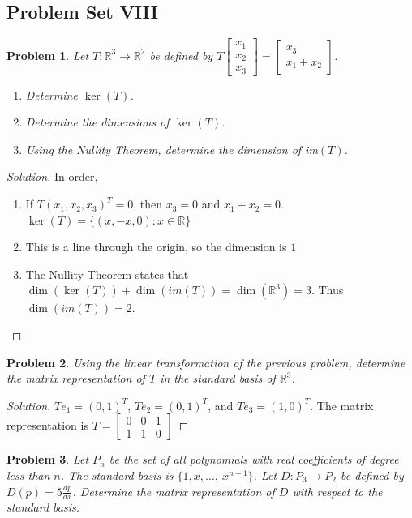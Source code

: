 \documentclass[oneside]{book}
\theoremstyle{mystyle}
\newtheorem{problem}{Problem}[section]
\begin{document}
\subsection{Problem Set VIII}
\begin{problem}
Let $T:\mathbb{R}^3\rightarrow \mathbb{R}^2$ be defined by $T\begin{bmatrix} x_1 \\ x_2 \\ x_3 \end{bmatrix} = \begin{bmatrix} x_3 \\ x_1+x_2 \end{bmatrix}$.
\begin{enumerate}[itemsep=0pt]
    \item Determine $\ker(T)$.
    \item Determine the dimensions of $\ker(T)$.
    \item Using the Nullity Theorem, determine the dimension of im$(T)$.
\end{enumerate}
\end{problem}
\begin{proof}[Solution]
In order,
\begin{enumerate}[itemsep=0pt]
    \item If $T(x_{1},x_{2},x_{3})^{T} = 0$, then $x_3=0$ and $x_{1}+x_{2}=0$. $\ker(T)=\{(x,-x,0):x\in \mathbb{R}\}$
    \item This is a line through the origin, so the dimension is $1$ 
    \item The Nullity Theorem states that $\dim(\ker(T))+\dim(im(T)) = \dim(\mathbb{R}^3) = 3$. Thus $\dim(im(T)) = 2$.
\end{enumerate}
\end{proof}
\begin{problem}
Using the linear transformation of the previous problem, determine the matrix representation of $T$ in the standard basis of $\mathbb{R}^3$.
\end{problem}
\begin{proof}[Solution]
$Te_1 = (0,1)^T$, $T e_2 = (0,1)^T$, and $Te_3 = (1,0)^T$. The matrix representation is $T=\begin{bmatrix} 0 & 0 & 1 \\ 1 & 1 & 0 \end{bmatrix}$
\end{proof}
\begin{problem}
Let $P_n$ be the set of all polynomials with real coefficients of degree less than $n$. The standard basis is $\{1,x,\hdots, \ x^{n-1}\}$. Let $D:P_3 \rightarrow P_2$ be defined by $D(p) = 5\frac{dp}{dx}$. Determine the matrix representation of $D$ with respect to the standard basis.
\end{problem}
\end{document}

